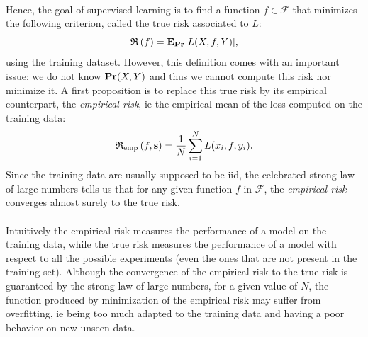 \paragraph{}
Hence, the goal of supervised learning is to find a function $f \in
\mathcal{F}$ that minimizes the following criterion, called the true risk
associated to $L$:
\begin{equation}\label{eq:true-risk}
    \mathfrak{R}\left(f\right)={\mathbf{{E}}}_{{\mathbf{{Pr}}}}[L(X,f,Y)],
\end{equation}
using the training dataset. However, this definition comes with an important
issue: we do not know ${\mathbf{{Pr}}}(X,Y)$ and thus we cannot compute this
risk nor minimize it.  A first proposition is to replace this true risk by its
empirical counterpart, the \emph{empirical risk}, \acs{ie} the empirical mean
of the loss computed on the training data:
\begin{dmath*}
    \riskemp{f, \seq{s}} = \frac{1}{N}\sum_{i=1}^N L(x_i, f, y_i).
\end{dmath*}
Since the training data are usually supposed to be \acs{iid}, the celebrated
strong law of large numbers tells us that for any given function $f$ in
$\mathcal{F}$, the \emph{empirical risk} converges almost surely to the true
risk.
\paragraph{}
Intuitively the empirical risk measures the performance of a model on the
training data, while the true risk measures the performance of a model with
respect to all the possible experiments (even the ones that are not present in
the training set). Although the convergence of the empirical risk to the true
risk is guaranteed by the strong law of large numbers, for a given value of
$N$, the function produced by minimization of the empirical risk may suffer
from overfitting, \acs{ie} being too much adapted to the training data and
having a poor behavior on new unseen data.
